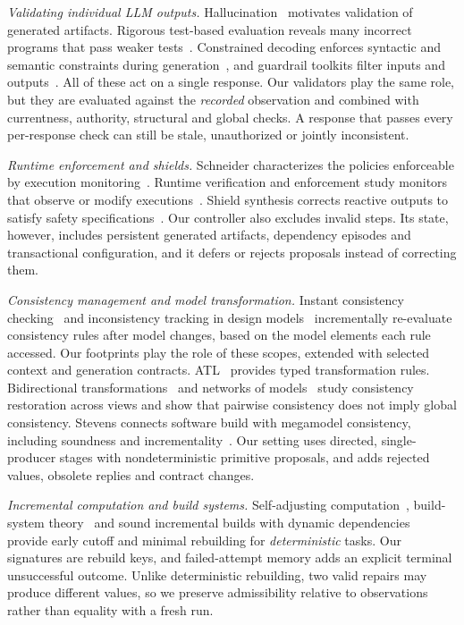 \documentclass[10pt,journal,compsoc]{IEEEtran}
\theoremstyle{plain}
\theoremstyle{definition}
\begin{document}
\emph{Validating individual LLM outputs.} Hallucination~\cite{ji2023hallucination} motivates validation of generated artifacts. Rigorous test-based evaluation reveals many incorrect programs that pass weaker tests~\cite{evalplus}. Constrained decoding enforces syntactic and semantic constraints during generation~\cite{synchromesh,outlines}, and guardrail toolkits filter inputs and outputs~\cite{nemoguardrails}. All of these act on a single response. Our validators play the same role, but they are evaluated against the \emph{recorded} observation and combined with currentness, authority, structural and global checks. A response that passes every per-response check can still be stale, unauthorized or jointly inconsistent.

\emph{Runtime enforcement and shields.} Schneider characterizes the policies enforceable by execution monitoring~\cite{schneider}. Runtime verification and enforcement study monitors that observe or modify executions~\cite{leucker2009rv,pinisetty}. Shield synthesis corrects reactive outputs to satisfy safety specifications~\cite{shield}. Our controller also excludes invalid steps. Its state, however, includes persistent generated artifacts, dependency episodes and transactional configuration, and it defers or rejects proposals instead of correcting them.

\emph{Consistency management and model transformation.} Instant consistency checking~\cite{egyed2006instant} and inconsistency tracking in design models~\cite{egyed2011tracking} incrementally re-evaluate consistency rules after model changes, based on the model elements each rule accessed. Our footprints play the role of these scopes, extended with selected context and generation contracts. ATL~\cite{atl} provides typed transformation rules. Bidirectional transformations~\cite{foster2007lenses} and networks of models~\cite{stevens,klare} study consistency restoration across views and show that pairwise consistency does not imply global consistency. Stevens connects software build with megamodel consistency, including soundness and incrementality~\cite{megamodelbuild}. Our setting uses directed, single-producer stages with nondeterministic primitive proposals, and adds rejected values, obsolete replies and contract changes.

\emph{Incremental computation and build systems.} Self-adjusting computation~\cite{acar}, build-system theory~\cite{mokhov} and sound incremental builds with dynamic dependencies~\cite{erdweg2015pluto} provide early cutoff and minimal rebuilding for \emph{deterministic} tasks. Our signatures are rebuild keys, and failed-attempt memory adds an explicit terminal unsuccessful outcome. Unlike deterministic rebuilding, two valid repairs may produce different values, so we preserve admissibility relative to observations rather than equality with a fresh run.
\end{document}
